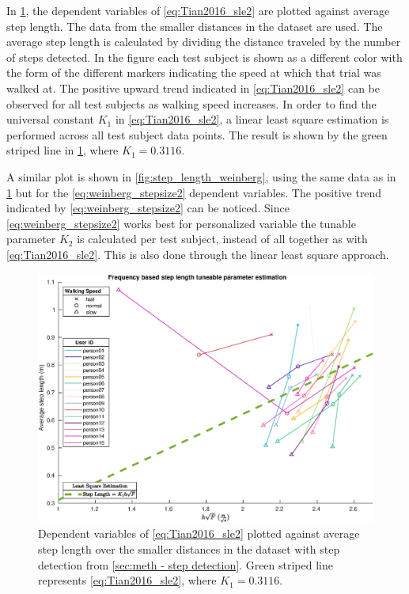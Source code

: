 In \cref{fig:step_length_tian}, the dependent variables of \eqref{eq:Tian2016_sle2} are plotted against average step length. The data from the smaller distances in the \citet{Vezocnik2019} dataset are used. The average step length is calculated by dividing the distance traveled by the number of steps detected. In the figure each test subject is shown as a different color with the form of the different markers indicating the speed at which that trial was walked at. The positive upward trend indicated in \eqref{eq:Tian2016_sle2} can be observed for all test subjects as walking speed increases. In order to find the universal constant $K_1$ in \eqref{eq:Tian2016_sle2}, a linear least square estimation is performed across all test subject data points. The result is shown by the green striped line in \cref{fig:step_length_tian}, where $ K_1 = 0.3116$. \par 

A similar plot is shown in \cref{fig:step_length_weinberg}, using the same data as in \cref{fig:step_length_tian} but for the \eqref{eq:weinberg_stepsize2} dependent variables. The positive trend indicated by \eqref{eq:weinberg_stepsize2} can be noticed. Since \eqref{eq:weinberg_stepsize2} works best for personalized variable the tunable parameter $ K_2 $ is calculated per test subject, instead of all together as with \eqref{eq:Tian2016_sle2}. This is also done through the linear least square approach.

	\begin{figure}[H]
	\centering
	\includegraphics[width=0.8\linewidth]{images/20201128_1304_}
	\caption{Dependent variables of \eqref{eq:Tian2016_sle2} plotted against average step length over the smaller distances in the \citet{Vezocnik2019} dataset with step detection from \cref{sec:meth - step detection}. Green striped line represents \eqref{eq:Tian2016_sle2}, where $ K_1 = 0.3116$.  }
	\label{fig:step_length_tian}
	\end{figure}

